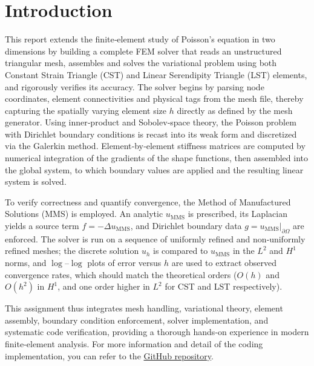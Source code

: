 \section{Introduction}

This report extends the finite‐element study of Poisson’s equation in two dimensions by building a complete FEM solver that reads an unstructured triangular mesh, assembles and solves the variational problem using both Constant Strain Triangle (CST) and Linear Serendipity Triangle (LST) elements, and rigorously verifies its accuracy.  The solver begins by parsing node coordinates, element connectivities and physical tags from the mesh file, thereby capturing the spatially varying element size $h$ directly as defined by the mesh generator.  Using inner‐product and Sobolev‐space theory, the Poisson problem with Dirichlet boundary conditions is recast into its weak form and discretized via the Galerkin method.  Element‐by‐element stiffness matrices are computed by numerical integration of the gradients of the shape functions, then assembled into the global system, to which boundary values are applied and the resulting linear system is solved.

To verify correctness and quantify convergence, the Method of Manufactured Solutions (MMS) is employed.  An analytic $u_{\mathrm{MMS}}$ is prescribed, its Laplacian yields a source term $f=-\Delta u_{\mathrm{MMS}}$, and Dirichlet boundary data $g=u_{\mathrm{MMS}}|_{\partial\Omega}$ are enforced.  The solver is run on a sequence of uniformly refined and non‐uniformly refined meshes; the discrete solution $u_h$ is compared to $u_{\mathrm{MMS}}$ in the $L^2$ and $H^1$ norms, and $\log$–$\log$ plots of error versus $h$ are used to extract observed convergence rates, which should match the theoretical orders ($O(h)$ and $O(h^2)$ in $H^1$, and one order higher in $L^2$ for CST and LST respectively).

This assignment thus integrates mesh handling, variational theory, element assembly, boundary condition enforcement, solver implementation, and systematic code verification, providing a thorough hands‐on experience in modern finite‐element analysis. For more information and detail of the coding implementation, you can refer to the \href{https://github.com/LukasWolff2002/TAREA_4_FINITE}{GitHub repository}.
